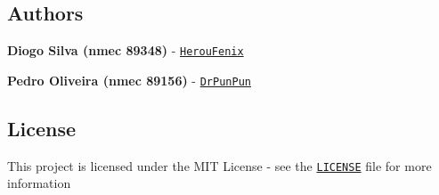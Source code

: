 \subsection*{Authors}


\begin{DoxyItemize}
\item {\bfseries Diogo Silva (nmec 89348)} -\/ \href{https://github.com/HerouFenix}{\tt Herou\+Fenix}
\item {\bfseries Pedro Oliveira (nmec 89156)} -\/ \href{https://github.com/DrPunPun}{\tt Dr\+Pun\+Pun}
\end{DoxyItemize}

\subsection*{License}

This project is licensed under the M\+IT License -\/ see the \href{https://github.com/heroufenix/image-processing-using-c/blob/master/LICENSE}{\tt L\+I\+C\+E\+N\+SE} file for more information 